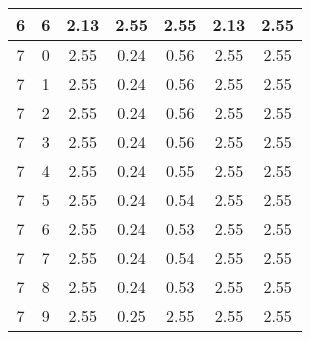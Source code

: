 \begin{longtable}{|c|c||c||c|c||c|c|}
	6 & 6 & 2.13 & 2.55 & 2.55 & 2.13 & 2.55 \\ \hline
	7 & 0 & 2.55 & 0.24 & 0.56 & 2.55 & 2.55 \\ \hline
	7 & 1 & 2.55 & 0.24 & 0.56 & 2.55 & 2.55 \\ \hline
	7 & 2 & 2.55 & 0.24 & 0.56 & 2.55 & 2.55 \\ \hline
	7 & 3 & 2.55 & 0.24 & 0.56 & 2.55 & 2.55 \\ \hline
	7 & 4 & 2.55 & 0.24 & 0.55 & 2.55 & 2.55 \\ \hline
	7 & 5 & 2.55 & 0.24 & 0.54 & 2.55 & 2.55 \\ \hline
	7 & 6 & 2.55 & 0.24 & 0.53 & 2.55 & 2.55 \\ \hline
	7 & 7 & 2.55 & 0.24 & 0.54 & 2.55 & 2.55 \\ \hline
	7 & 8 & 2.55 & 0.24 & 0.53 & 2.55 & 2.55 \\ \hline
	7 & 9 & 2.55 & 0.25 & 2.55 & 2.55 & 2.55 \\ \hline
\end{longtable}
\clearpage{}
